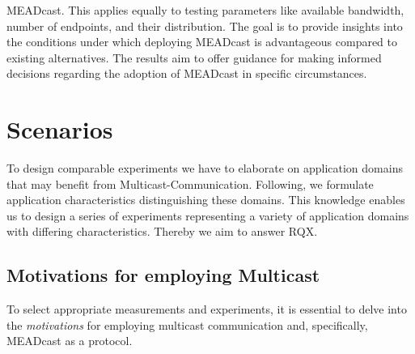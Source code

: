 \begin{itemize}
            MEADcast.
        This applies equally to testing parameters like available bandwidth,
            number of endpoints, and their distribution.
        The goal is to provide insights into the conditions under which
            deploying MEADcast is advantageous compared to existing
            alternatives.
        The results aim to offer guidance for making informed decisions
            regarding the adoption of MEADcast in specific circumstances.
\end{itemize}




\section{Scenarios} %
\label{sec:Scenarios}


To design comparable experiments we have to elaborate on application domains
    that may benefit from Multicast-Communication.
Following, we formulate application characteristics distinguishing these
    domains.
This knowledge enables us to design a series of experiments representing
    a variety of application domains with differing characteristics.
Thereby we aim to answer RQX.

\subsection{Motivations for employing Multicast} %
\label{sub:MotivationsForMulticast}
To select appropriate measurements and experiments, it is essential to delve
    into the \textit{motivations} for employing multicast communication and,
    specifically, MEADcast as a protocol.

